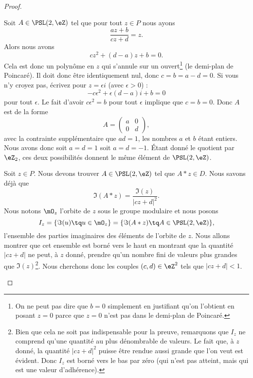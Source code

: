 \begin{proof}
\begin{subproof}
		Soit \( A\in\PSL(2,\eZ)\) tel que pour tout \( z\in P\) nous ayons
		\begin{equation}
			\frac{ az+b }{ cz+d }=z.
		\end{equation}
		Alors nous avons
		\begin{equation}
			cz^2+(d-a)z+b=0.
		\end{equation}
		Cela est donc un polynôme en \( z\) qui s'annule sur un ouvert\footnote{On ne peut pas dire que \( b=0\) simplement en justifiant qu'on l'obtient en posant \( z=0\) parce que \( z=0\) n'est pas dans le demi-plan de Poincaré.} (le demi-plan de Poincaré). Il doit donc être identiquement nul, donc \( c=b=a-d=0\). Si vous n'y croyez pas, écrivez pour \( z=\epsilon i\) (avec \( \epsilon>0\)) :
		\begin{equation}
			-c\epsilon^2+\epsilon(d-a)i+b=0
		\end{equation}
		pour tout \( \epsilon\). Le fait d'avoir \( c\epsilon^2=b\) pour tout \( \epsilon\) implique que \( c=b=0\). Donc \( A\) est de la forme
		\begin{equation}
			A=\begin{pmatrix}
				a & 0 \\
				0 & d
			\end{pmatrix},
		\end{equation}
		avec la contrainte supplémentaire que \( ad=1\), les nombres \( a\) et \( b\) étant entiers. Nous avons donc soit \( a=d=1\) soit \( a=d=-1\). Étant donné le quotient par \( \eZ_2\), ces deux possibilités donnent le même élément de \( \PSL(2,\eZ)\).



		Soit \( z\in P\). Nous devons trouver \( A\in\PSL(2,\eZ)\) tel que \( A*z\in D\). Nous savons déjà que
		\begin{equation}
			\Im(A*z)=\frac{ \Im(z) }{ | cz+d |^2 }.
		\end{equation}
		Nous notons \( \mO_z\) l'orbite de \( z\) sous le groupe modulaire et nous posons
		\begin{equation}
			I_z=\{ \Im(u)\tq u\in \mO_z \}=\{ \Im(A*z)\tq A\in\PSL(2,\eZ) \},
		\end{equation}
		l'ensemble des parties imaginaires des éléments de l'orbite de \( z\). Nous allons montrer que cet ensemble est borné vers le haut en montrant que la quantité \( | cz+d |\) ne peut, à \( z\) donné, prendre qu'un nombre fini de valeurs plus grandes que \( \Im(z)\)\footnote{Bien que cela ne soit pas indispensable pour la preuve, remarquons que \( I_z\) ne comprend qu'une quantité au plus dénombrable de valeurs. Le fait que, à \( z\) donné, la quantité \( | cz+d |^2\) puisse être rendue aussi grande que l'on veut est évident. Donc \( I_z\) est borné vers le bas par zéro (qui n'est pas atteint, mais qui est une valeur d'adhérence).}. Nous cherchons donc les couples \( (c,d)\in \eZ^2\) tels que \( | cz+d |<1\).


\end{subproof}
\end{proof}
